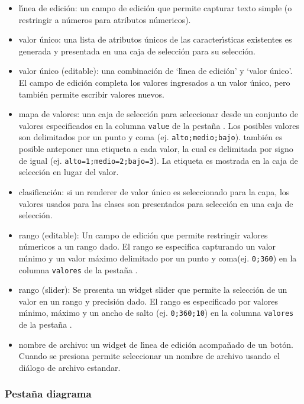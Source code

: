 \begin{itemize}
\item l\'{\i}nea de edici\'on: un campo de edici\'on que permite capturar texto simple (o restringir a 
n\'umeros para atributos n\'umericos).
\item valor \'unico: una lista de atributos \'unicos de las caracter\'{\i}sticas existentes
es generada y presentada en una caja de selecci\'on para su selecci\'on.
\item  valor  \'unico (editable): una combinaci\'on de `l\'{\i}nea de edici\'on' y `valor \'unico'.
El campo de edici\'on completa los valores ingresados a un valor \'unico, pero también permite
escribir valores nuevos.
\item mapa de valores: una caja de selecci\'on para seleccionar desde un conjunto de valores especificados en la
columna \texttt{value} de la pesta\~na .  Los posibles valores son 
delimitados por un punto y coma (ej. \verb|alto;medio;bajo|). también es posible
anteponer una etiqueta a cada valor, la cual es delimitada por signo de igual (ej.
\verb|alto=1;medio=2;bajo=3|). La etiqueta es mostrada en la caja de selecci\'on en lugar
del valor.
\item clasificaci\'on: si un renderer de valor \'unico es seleccionado para la capa, los valores
usados para las clases son presentados para selecci\'on en una caja de selecci\'on.
\item rango (editable): Un campo de edici\'on que permite restringir valores n\'umericos a un
rango dado.  El rango se especifica capturando un valor m\'{\i}nimo y un valor m\'aximo
delimitado por un punto y coma(ej. \verb|0;360|) en la columna \texttt{valores} de
la pesta\~na .
\item rango (slider): Se presenta un widget slider que permite la selecci\'on de un valor
en un rango y precisi\'on dado.  El rango es especificado por valores m\'{\i}nimo, m\'aximo
y un ancho de salto (ej. \verb|0;360;10|) en la columna \texttt{valores} de
la pesta\~na .
\item nombre de archivo: un widget de l\'{\i}nea de edici\'on acompa\~nado de un bot\'on. Cuando se
presiona permite seleccionar un nombre de archivo usando el di\'alogo de archivo estandar.
\end{itemize}

\subsubsection{Pesta\~na diagrama}\label{sec:diagram}

